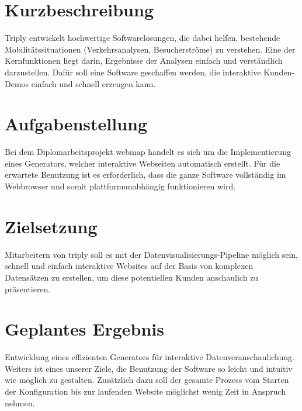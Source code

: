 \section{Kurzbeschreibung}
Triply entwickelt hochwertige Softwarelösungen, die dabei helfen, bestehende Mobilitätssituationen (Verkehrsanalysen,
Besucherströme) zu verstehen.
Eine der Kernfunktionen liegt darin, Ergebnisse der Analysen einfach und verständlich
darzustellen.
Dafür soll eine Software geschaffen werden, die interaktive Kunden-Demos einfach und schnell erzeugen kann.

\section{Aufgabenstellung}
Bei dem Diplomarbeitsprojekt webmap handelt es sich um die Implementierung eines Generators, welcher interaktive
Webseiten automatisch erstellt.
Für die erwartete Benutzung ist es erforderlich, dass die ganze Software vollständig im Webbrowser
und somit plattformunabhängig funktionieren wird.

\section{Zielsetzung}
Mitarbeitern von triply soll es mit der Datenvisualisierungs-Pipeline möglich sein, schnell und einfach
interaktive Websites auf der Basis von komplexen Datensätzen zu erstellen, um diese potentiellen Kunden
anschaulich zu präsentieren.

\section{Geplantes Ergebnis}
Entwicklung eines effizienten Generators für interaktive Datenveranschaulichung.
Weiters ist eines unserer Ziele, die Benutzung der Software so leicht und intuitiv wie möglich zu gestalten.
Zusätzlich dazu soll der gesamte
Prozess vom Starten der Konfiguration bis zur laufenden Website möglichst wenig Zeit in Anspruch nehmen.
